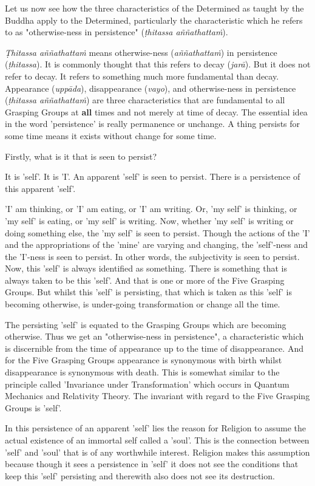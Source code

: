 Let us now see how the three characteristics of the Determined as taught by the Buddha apply to the Determined, particularly the characteristic which he refers to as "otherwise-ness in persistence" (\emph{ṭhitassa aññathattaṁ}).

\emph{Ṭhitassa aññathattaṁ} means otherwise-ness (\emph{aññathattaṁ}) in persistence (\emph{ṭhitassa}). It is commonly thought that this refers to decay (\emph{jarā}). But it does not refer to decay. It refers to something much more fundamental than decay. Appearance (\emph{uppāda}), disappearance (\emph{vayo}), and otherwise-ness in persistence (\emph{ṭhitassa aññathattaṁ}) are three characteristics that are fundamental to all Grasping Groups at \textbf{all} times and not merely at time of decay. The essential idea in the word 'persistence' is really permanence or unchange. A thing persists for some time means it exists without change for some time.

Firstly, what is it that is seen to persist?

It is 'self'. It is 'I'. An apparent 'self' is seen to persist. There is a persistence of this apparent 'self'.

'I' am thinking, or 'I' am eating, or 'I' am writing. Or, 'my self' is thinking, or 'my self' is eating, or 'my self' is writing. Now, whether 'my self' is writing or doing something else, the 'my self' is seen to persist. Though the actions of the 'I' and the appropriations of the 'mine' are varying and changing, the 'self'-ness and the 'I'-ness is seen to persist. In other words, the subjectivity is seen to persist. Now, this 'self' is always identified as something. There is something that is always taken to be this 'self'. And that is one or more of the Five Grasping Groups. But whilst this 'self' is persisting, that which is taken as this 'self' is becoming otherwise, is under-going transformation or change all the time.

The persisting 'self' is equated to the Grasping Groups which are becoming otherwise. Thus we get an "otherwise-ness in persistence", a characteristic which is discernible from the time of appearance up to the time of disappearance. And for the Five Grasping Groups appearance is synonymous with birth whilst disappearance is synonymous with death. This is somewhat similar to the principle called 'Invariance under Transformation' which occurs in Quantum Mechanics and Relativity Theory. The invariant with regard to the Five Grasping Groups is 'self'.

In this persistence of an apparent 'self' lies the reason for Religion to assume the actual existence of an immortal self called a 'soul'. This is the connection between 'self' and 'soul' that is of any worthwhile interest. Religion makes this assumption because though it sees a persistence in 'self' it does not see the conditions that keep this 'self' persisting and therewith also does not see its destruction.

